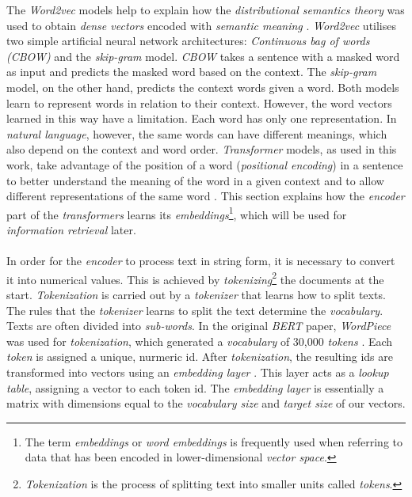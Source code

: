\documentclass{article}
\begin{document}
The \textit{Word2vec} models help to explain how the \textit{distributional semantics theory} was used to obtain \textit{dense vectors} encoded with \textit{semantic meaning} \cite{word2vec}. \textit{Word2vec} utilises two simple artificial neural network architectures: \textit{Continuous bag of words (CBOW)} and the \textit{skip-gram} model. \textit{CBOW} takes a sentence with a masked word as input and predicts the masked word based on the context.  The \textit{skip-gram} model, on the other hand, predicts the context words given a word. Both models learn to represent words in relation to their context.
However, the word vectors learned in this way have a limitation. Each word has only one representation. In \textit{natural language}, however, the same words can have different meanings, which also depend on the context and word order. \textit{Transformer} models, as used in this work, take advantage of the position of a word (\textit{positional encoding}) in a sentence to better understand the meaning of the word in a given context and to allow different representations of the same word \cite{attentionIsAllYouNeed}. This section explains how the \textit{encoder} part of the \textit{transformers} learns its \textit{embeddings}\footnote{The term \textit{embeddings} or \textit{word embeddings} is frequently used when referring to data that has been encoded in lower-dimensional \textit{vector space}.}, which will be used for \textit{information retrieval} later.\\
\\
In order for the \textit{encoder} to process text in string form, it is necessary to convert it into numerical values. This is achieved by \textit{tokenizing}\footnote{\textit{Tokenization} is the process of splitting text into smaller units called \textit{tokens}.} the documents at the start. \textit{Tokenization} is carried out by a \textit{tokenizer} that learns how to split texts.  The rules that the \textit{tokenizer} learns to split the text determine the \textit{vocabulary}. Texts are often divided into \textit{sub-words}. In the original \textit{BERT} paper, \textit{WordPiece} was used for \textit{tokenization}, which generated a \textit{vocabulary} of 30,000 \textit{tokens} \cite{bert}. Each \textit{token} is assigned a unique, nurmeric id.
After \textit{tokenization}, the resulting ids are transformed into vectors using an \textit{embedding layer} \cite[p.~65]{huggingface}. This layer acts as a \textit{lookup table}, assigning a vector to each token id. The \textit{embedding layer} is essentially a matrix with dimensions equal to the \textit{vocabulary size} and \textit{target size} of our vectors.
\end{document}
